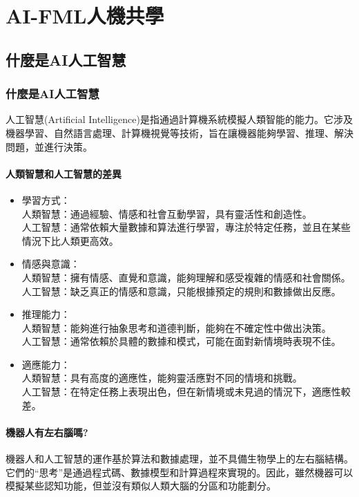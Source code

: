 \chapter{AI-FML人機共學}
\section{什麼是AI人工智慧}
\subsection{什麼是AI人工智慧}
 人工智慧(Artificial Intelligence)是指通過計算機系統模擬人類智能的能力。它涉及機器學習、自然語言處理、計算機視覺等技術，旨在讓機器能夠學習、推理、解決問題，並進行決策。
\subsubsection{人類智慧和人工智慧的差異}
\begin{itemize}
    \item 學習方式：\\
        人類智慧：通過經驗、情感和社會互動學習，具有靈活性和創造性。\\
        人工智慧：通常依賴大量數據和算法進行學習，專注於特定任務，並且在某些情況下比人類更高效。
    \item 情感與意識： \\
        人類智慧：擁有情感、直覺和意識，能夠理解和感受複雜的情感和社會關係。\\
        人工智慧：缺乏真正的情感和意識，只能根據預定的規則和數據做出反應。
    \item 推理能力： \\
        人類智慧：能夠進行抽象思考和道德判斷，能夠在不確定性中做出決策。\\
        人工智慧：通常依賴於具體的數據和模式，可能在面對新情境時表現不佳。 
\item 適應能力：\\
        人類智慧：具有高度的適應性，能夠靈活應對不同的情境和挑戰。\\
        人工智慧：在特定任務上表現出色，但在新情境或未見過的情況下，適應性較差。
\end{itemize}

\subsubsection{機器人有左右腦嗎?}
機器人和人工智慧的運作基於算法和數據處理，並不具備生物學上的左右腦結構。它們的“思考”是通過程式碼、數據模型和計算過程來實現的。因此，雖然機器可以模擬某些認知功能，但並沒有類似人類大腦的分區和功能劃分。 \newpage

